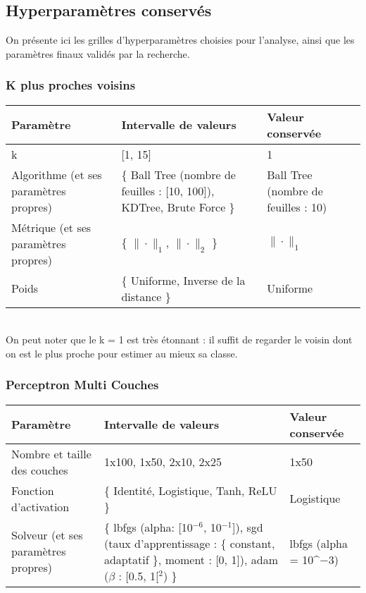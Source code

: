 \subsection{Hyperparamètres conservés}

On présente ici les grilles d'hyperparamètres choisies pour l'analyse, ainsi que les paramètres finaux validés par la recherche.

\subsubsection*{K plus proches voisins}

\noindent
\begin{tabularx}{\textwidth}{|X|X|X|}
    \hline
    \bf{Paramètre} & \bf{Intervalle de valeurs} & \bf{Valeur conservée}\\
    \hline
    k & [1, 15] & 1\\\hline
    Algorithme (et ses paramètres propres) & \{ Ball Tree (nombre de feuilles : [10, 100]), KDTree, Brute Force \} & Ball Tree (nombre de feuilles : 10)\\\hline
    Métrique (et ses paramètres propres) & \{ $\|\cdot\|_1$, $\|\cdot\|_2$ \} & $\|\cdot\|_1$\\\hline
    Poids & \{ Uniforme, Inverse de la distance \} & Uniforme\\\hline
\end{tabularx}\\

On peut noter que le k = 1 est très étonnant : il suffit de regarder le voisin dont on est le plus proche pour estimer au mieux sa classe.

\subsubsection*{Perceptron Multi Couches}

\noindent
\begin{tabularx}{\textwidth}{|X|X|X|}
    \hline
    \bf{Paramètre} & \bf{Intervalle de valeurs} & \bf{Valeur conservée}\\
    \hline
    Nombre et taille des couches  & 1x100, 1x50, 2x10, 2x25 & 1x50 \\\hline
    Fonction d'activation & \{ Identité, Logistique, Tanh, ReLU \} & Logistique \\\hline
    Solveur (et ses paramètres propres) & \{ lbfgs (alpha: [10$^{-6}$, 10$^{-1}$]), sgd (taux d'apprentissage : \{ constant, adaptatif \}, moment : [0, 1]), adam ($\beta$ : [0.5, 1[$^2$) \} & lbfgs (alpha = 10^${-3}$)\\\hline
\end{tabularx}

